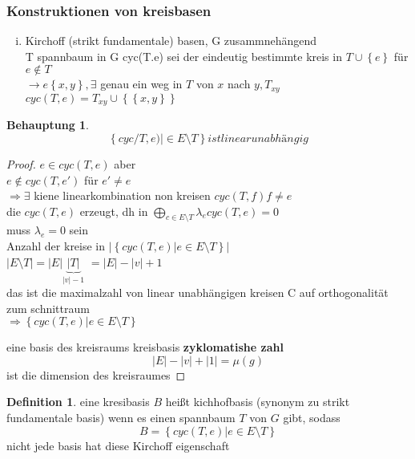 \documentclass[a4paper]{article}
\newtheorem{behauptung}{Behauptung}
\theoremstyle{definition}
\newtheorem{definition}{Definition}
\theoremstyle{remark}
\begin{document}
\subsubsection{Konstruktionen von kreisbasen}
\label{ssub:konstruktionen_von_kreisbasen}

\begin{enumerate}[(i)]
  \item Kirchoff (strikt fundamentale) basen, G zusammnehängend\\
    T spannbaum in G 
    cyc(T.e)  sei der eindeutig bestimmte kreis in $T\cup \left\{ e \right\}$ für $e\notin T$\\
    $\rightarrow e\left\{ x,y \right\}, \exists$ genau ein weg in $T$ von $x$ nach $y, T_{xy}$\\
    $cyc (T,e) = T_{xy}\cup \left\{ \left\{ x,y \right\} \right\}$




\end{enumerate}

\begin{behauptung}
  \begin{equation*}
  \left\{ cyc/T,e)|\in E\setminus T \right\}
  ist linear unabhängig
  \end{equation*}
\end{behauptung}
\begin{proof}
  $e\in cyc(T,e)$ aber \\
  $e\notin cyc(T,e')$ für $e'\neq e$\\
  $\Rightarrow \exists$ kiene linearkombination non kreisen $cyc(T,f)  f\neq e$\\ 
  die $cyc(T,e)$ erzeugt, dh in $\bigoplus _{c \in E \setminus T} \lambda_e cyc (T,e)=0$\\
  muss $\lambda _e=0$ sein \\
  Anzahl der kreise in $|\left\{ cyc(T,e) | e\in E\setminus T \right\}|$\\
  $|E\setminus T | = |E| \underbrace{|T|}_{|v|-1}$
  $=|E|-|v|+1$\\
  das ist die maximalzahl von linear unabhängigen kreisen C auf orthogonalität zum schnittraum \\
  $\Rightarrow\left\{ cyc(T,e)| e\in E\setminus T \right\}$

eine basis des kreisraums kreisbasis 
\textbf{zyklomatishe zahl} 
\begin{equation*}
  |E|-|v|+|1|= \mu(g)
\end{equation*}
ist die dimension des kreisraumes

\end{proof}
\begin{definition}
  eine kresibasis $B$ heißt kichhofbasis (synonym zu strikt fundamentale basis) wenn es einen spannbaum $T$ von $G$ gibt, sodass 
  \begin{equation*}
    B= \left\{ cyc(T,e)|e\in E\setminus T \right\}
  \end{equation*} 
  nicht jede basis hat diese Kirchoff eigenschaft
\end{definition}
\end{document}
